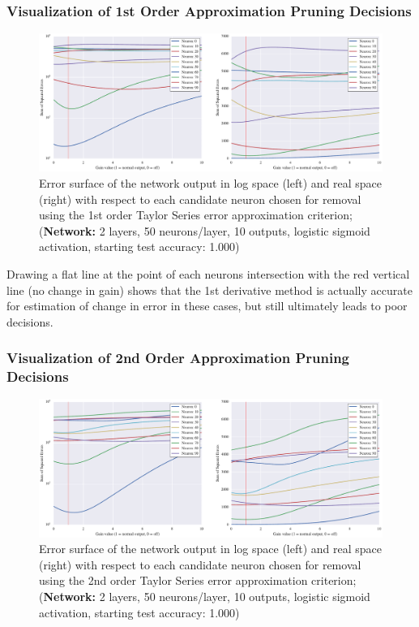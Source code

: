 \subsubsection{Visualization of 1st Order Approximation Pruning Decisions}
\begin{figure}[!ht]
\centering
\includegraphics[width=\linewidth]{png/mnist-deep-g1-gain.pdf}
\caption{Error surface of the network output in log space (left) and real space (right) with respect to each candidate neuron chosen for removal using the 1st order Taylor Series error approximation criterion; (\textbf{Network:} 2 layers, 50 neurons/layer, 10 outputs, logistic sigmoid activation, starting test accuracy: 1.000)}
\label{fig:mnist-g1-double-layer}
\end{figure}

Drawing a flat line at the point of each neurons intersection with the red vertical line (no change in gain) shows that the 1st derivative method is actually accurate for estimation of change in error in these cases, but still ultimately leads to poor decisions. 

\subsubsection{Visualization of 2nd Order Approximation Pruning Decisions}
\begin{figure}[!ht]
\centering
\includegraphics[width=\linewidth]{png/mnist-deep-g2-gain.pdf}
\caption{Error surface of the network output in log space (left) and real space (right) with respect to each candidate neuron chosen for removal using the 2nd order Taylor Series error approximation criterion; (\textbf{Network:} 2 layers, 50 neurons/layer, 10 outputs, logistic sigmoid activation, starting test accuracy: 1.000)}
\label{fig:mnist-g2-double-layer}
\end{figure}

